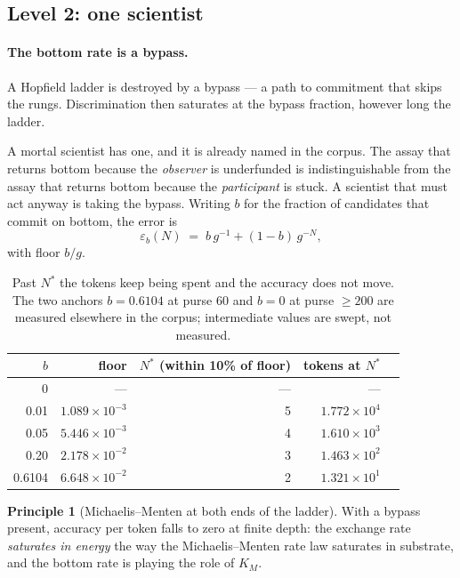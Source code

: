 \documentclass[11pt]{article}
\theoremstyle{plain}
\theoremstyle{definition}
\newtheorem{principle}[theorem]{Principle}
\theoremstyle{remark}
\begin{document}
\subsection{Level 2: one scientist}
\label{sec:l2}

\paragraph{The bottom rate is a bypass.}
A Hopfield ladder is destroyed by a bypass --- a path to commitment that skips
the rungs. Discrimination then saturates at the bypass fraction, however long
the ladder.

A mortal scientist has one, and it is already named in the corpus. The assay
that returns bottom because the \emph{observer} is underfunded is
indistinguishable from the assay that returns bottom because the
\emph{participant} is stuck. A scientist that must act anyway is taking the
bypass. Writing $b$ for the fraction of candidates that commit on bottom, the
error is
\[
\varepsilon_b(N) \;=\; b\,g^{-1} + (1-b)\,g^{-N},
\]
with floor $b/g$.

\begin{table}[h]
\centering
\begin{tabular}{@{}rrrrr@{}}
\toprule
$b$ & floor & $N^{*}$ (within 10\% of floor) & tokens at $N^{*}$ \\
\midrule
0 & --- & --- & --- \\
0.01 & $1.089\times10^{-3}$ & 5 & $1.772\times10^{4}$ \\
0.05 & $5.446\times10^{-3}$ & 4 & $1.610\times10^{3}$ \\
0.20 & $2.178\times10^{-2}$ & 3 & $1.463\times10^{2}$ \\
0.6104 & $6.648\times10^{-2}$ & 2 & $1.321\times10^{1}$ \\
\bottomrule
\end{tabular}
\caption{Past $N^{*}$ the tokens keep being spent and the accuracy does not
move. The two anchors $b = 0.6104$ at purse 60 and $b = 0$ at purse
$\geq 200$ are measured elsewhere in the corpus; intermediate values are
swept, not measured.}
\label{tab:e4}
\end{table}

\begin{principle}[Michaelis--Menten at both ends of the ladder]
With a bypass present, accuracy per token falls to zero at finite depth: the
exchange rate \emph{saturates in energy} the way the Michaelis--Menten rate law
saturates in substrate, and the bottom rate is playing the role of $K_M$.
\end{principle}
\end{document}
